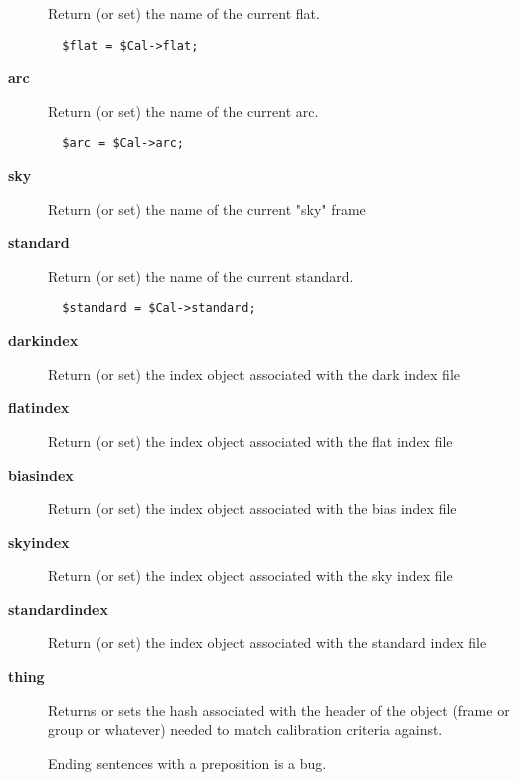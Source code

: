 \begin{description}
Return (or set) the name of the current flat.

\begin{verbatim}
  $flat = $Cal->flat;
\end{verbatim}
\item[\textbf{arc}] \mbox{}

Return (or set) the name of the current arc.

\begin{verbatim}
  $arc = $Cal->arc;
\end{verbatim}
\item[\textbf{sky}] \mbox{}

Return (or set) the name of the current "sky" frame

\item[\textbf{standard}] \mbox{}

Return (or set) the name of the current standard.

\begin{verbatim}
  $standard = $Cal->standard;
\end{verbatim}
\item[\textbf{darkindex}] \mbox{}

Return (or set) the index object associated with the dark index file

\item[\textbf{flatindex}] \mbox{}

Return (or set) the index object associated with the flat index file

\item[\textbf{biasindex}] \mbox{}

Return (or set) the index object associated with the bias index file

\item[\textbf{skyindex}] \mbox{}

Return (or set) the index object associated with the sky index file

\item[\textbf{standardindex}] \mbox{}

Return (or set) the index object associated with the standard index file

\item[\textbf{thing}] \mbox{}

Returns or sets the hash associated with the header of the object
(frame or group or whatever) needed to match calibration criteria
against.



Ending sentences with a preposition is a bug.

\end{description}
